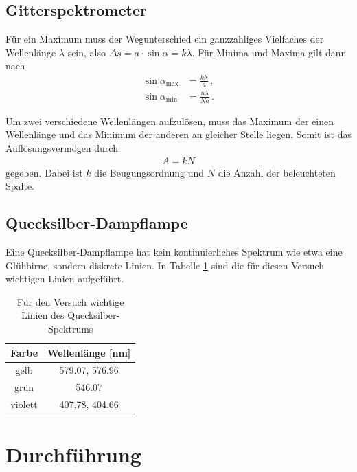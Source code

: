 \documentclass[12pt,a4paper,titlepage,headinclude,bibtotoc]{scrartcl}
\begin{document}
\subsection{Gitterspektrometer}
Für ein Maximum muss der Wegunterschied ein ganzzahliges Vielfaches der Wellenlänge $\lambda$ sein, also $\Delta s=a \cdot \sin \alpha=k \lambda$.
Für Minima und Maxima gilt dann nach \cite[S.461ff.]{hecht}
\begin{align}
	\sin\alpha_\text{max}&=\frac{k\lambda}{a}\,,\\
	\sin\alpha_\text{min}&=\frac{n\lambda}{Na}\,.
\end{align}

Um zwei verschiedene Wellenlängen aufzulösen, muss das Maximum der einen Wellenlänge und das Minimum der anderen an gleicher Stelle liegen.
Somit ist das Auflösungsvermögen durch
\begin{align}
	A=kN
\end{align}
gegeben.
Dabei ist $k$ die Beugungsordnung und $N$ die Anzahl der beleuchteten Spalte.

\subsection{Quecksilber-Dampflampe}
Eine Quecksilber-Dampflampe hat kein kontinuierliches Spektrum wie etwa eine Glühbirne, sondern diskrete Linien.
In Tabelle \ref{tab:Hg-Linien} sind die für diesen Versuch wichtigen Linien aufgeführt.

\begin{table}
	\centering
	\begin{tabular}{|c|c|}
	    \hline		
		Farbe & Wellenlänge [nm]\\
		\hline
		\hline
		gelb & 579.07, 576.96\\
		\hline		
		grün & 546.07\\
		\hline
		violett & 407.78, 404.66\\
		\hline	
	\end{tabular}
	\caption{Für den Versuch wichtige Linien des Quecksilber-Spektrums}
	\label{tab:Hg-Linien}
\end{table}

\section{Durchführung}
\label{sec:durchfuehrung}
\end{document}
